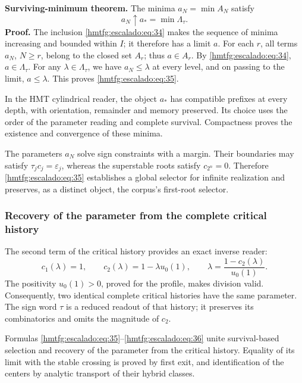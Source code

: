 \textbf{Surviving-minimum theorem.} The minima \(a_N=\min A_N\) satisfy
\begin{equation}
\boxed{a_N\uparrow a_*=\min\Lambda_\tau.}
\label{hmtfg:escalado:eq:35}
\end{equation}
\textbf{Proof.} The inclusion \eqref{hmtfg:escalado:eq:34} makes the sequence of minima increasing and bounded within \(I\); it therefore has a limit \(a\). For each \(r\), all terms \(a_N\), \(N\ge r\), belong to the closed set \(A_r\); thus \(a\in A_r\). By \eqref{hmtfg:escalado:eq:34}, \(a\in\Lambda_\tau\). For any \(\lambda\in\Lambda_\tau\), we have \(a_N\le\lambda\) at every level, and on passing to the limit, \(a\le\lambda\). This proves \eqref{hmtfg:escalado:eq:35}.

In the HMT cylindrical reader, the object \(a_*\) has compatible prefixes at every depth, with orientation, remainder and memory preserved. Its choice uses the order of the parameter reading and complete survival. Compactness proves the existence and convergence of these minima.

The parameters \(a_N\) solve sign constraints with a margin. Their boundaries may satisfy \(\tau_jc_j=\varepsilon_j\), whereas the superstable roots satisfy \(c_{2^n}=0\). Therefore \eqref{hmtfg:escalado:eq:35} establishes a global selector for infinite realization and preserves, as a distinct object, the corpus’s first-root selector.

\subsubsection{Recovery of the parameter from the complete critical history}
\label{hmtfg:escalado:13.7}

The second term of the critical history provides an exact inverse reader:
\begin{equation}
c_1(\lambda)=1,\qquad
c_2(\lambda)=1-\lambda u_0(1),\qquad
\boxed{\lambda=\frac{1-c_2(\lambda)}{u_0(1)}.}
\label{hmtfg:escalado:eq:36}
\end{equation}
The positivity \(u_0(1)>0\), proved for the profile, makes division valid. Consequently, two identical complete critical histories have the same parameter. The sign word \(\tau\) is a reduced readout of that history; it preserves its combinatorics and omits the magnitude of \(c_2\).

Formulas \eqref{hmtfg:escalado:eq:35}–\eqref{hmtfg:escalado:eq:36} unite survival-based selection and recovery of the parameter from the critical history. Equality of its limit with the stable crossing is proved by first exit, and identification of the centers by analytic transport of their hybrid classes.
